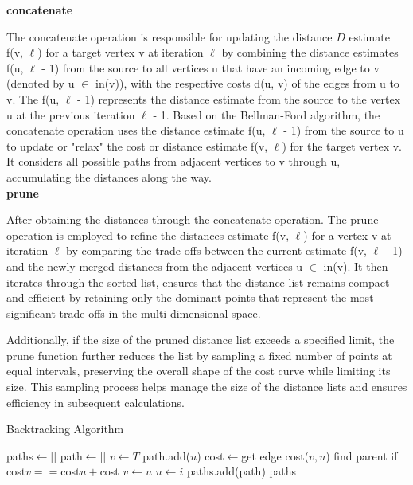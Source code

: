 \textbf {concatenate} 

The concatenate operation is responsible for updating the distance $D$ estimate f(v, $\ell$) for a target vertex v at iteration $\ell$ by combining the distance estimates f(u, $\ell$ - 1) from the source to all vertices u that have an incoming edge to v (denoted by u $\in$ in(v)), with the respective costs d(u, v) of the edges from u to v. The f(u, $\ell$ - 1) represents the distance estimate from the source to the vertex u at the previous iteration $\ell$ - 1. Based on the Bellman-Ford algorithm, the concatenate operation uses the distance estimate f(u, $\ell$ - 1) from the source to u to update or "relax" the cost or distance estimate f(v, $\ell$) for the target vertex v. It considers all possible paths from adjacent vertices to v through u, accumulating the distances along the way.\\

\textbf {prune} 
 
After obtaining the distances through the concatenate operation. The prune operation is employed to refine the distances estimate f(v, $\ell$) for a vertex v at iteration $\ell$ by comparing the trade-offs between the current estimate f(v, $\ell$ - 1) and the newly merged distances from the adjacent vertices u $\in$ in(v). It then iterates through the sorted list, ensures that the distance list remains compact and efficient by retaining only the dominant points that represent the most significant trade-offs in the multi-dimensional space.  


Additionally, if the size of the pruned distance list exceeds a specified limit, the prune function further reduces the list by sampling a fixed number of points at equal intervals, preserving the overall shape of the cost curve while limiting its size. This sampling process helps manage the size of the distance lists and ensures efficiency in subsequent calculations.

\begin{algorithm}
\caption{Backtracking Algorithm}
\begin{algorithmic}[1]
        \State paths$\gets$[]
            \State path$\gets$[]
            \State$v \gets T$
                \State path.add($u$)
                \State cost$\gets$get edge cost($v, u$)
                        \State find parent if cost$v ==$cost$u +$cost
                        \State$v \gets u$
                        \State$u \gets i$
                    \EndIf
                \EndFor
            \EndWhile
            \State paths.add(path)
        \EndFor
        \State \Return paths
    \EndFunction
\end{algorithmic}
\end{algorithm}

